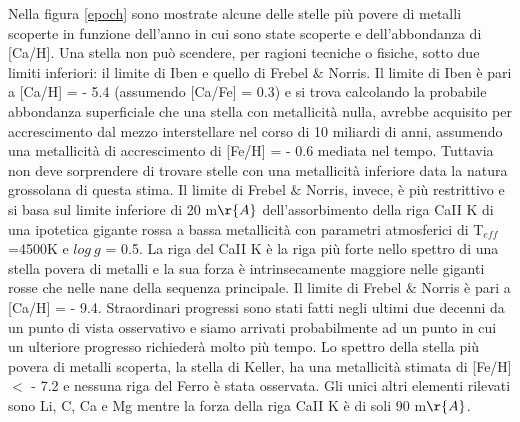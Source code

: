 \documentclass[12pt]{article}
\begin{document}
Nella figura \ref{epoch} sono mostrate alcune delle stelle più povere di metalli scoperte in funzione dell’anno in cui sono state scoperte e dell’abbondanza di [Ca/H]. 
Una stella non può scendere, per ragioni tecniche o fisiche, sotto due limiti inferiori: il limite di Iben e quello di Frebel $\&$ Norris.
Il limite di Iben è pari a [Ca/H] = - 5.4 (assumendo [Ca/Fe] = 0.3) e si trova calcolando la probabile abbondanza superficiale che una stella con metallicità nulla, avrebbe acquisito per accrescimento dal mezzo interstellare nel corso di 10 miliardi di anni, assumendo una metallicità di accrescimento di [Fe/H] = - 0.6 mediata nel tempo. Tuttavia non deve sorprendere di trovare stelle con una metallicità inferiore data la natura grossolana di questa stima.  Il limite di Frebel $\&$ Norris, invece, è più restrittivo e si basa sul limite inferiore di 20 m$\r{A}$ dell’assorbimento della riga CaII K di una ipotetica gigante rossa a bassa metallicità con parametri atmosferici di T$_{eff}$=4500K e $log\ g$ = 0.5. La riga del CaII K è la riga più forte nello spettro di una stella povera di metalli e la sua forza è intrinsecamente maggiore nelle giganti rosse che nelle nane della sequenza principale. Il limite di Frebel $\&$ Norris è pari a [Ca/H] = - 9.4. Straordinari progressi sono stati fatti negli ultimi due decenni da un punto di vista osservativo e siamo arrivati probabilmente ad un punto in cui un ulteriore progresso richiederà molto più tempo. Lo spettro della stella più povera di metalli scoperta, la stella di Keller, ha una metallicità stimata di [Fe/H] $<$ - 7.2 e nessuna riga del Ferro è stata osservata. Gli unici altri elementi rilevati sono Li, C, Ca e Mg mentre la forza della riga CaII K è di soli 90 m$\r{A}$. 
\end{document}
